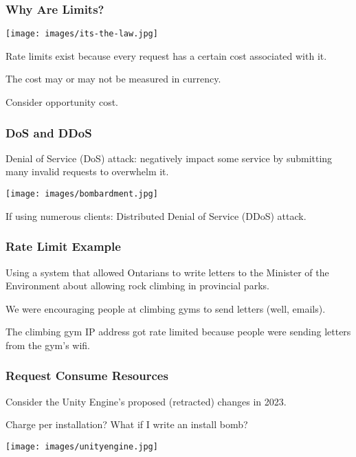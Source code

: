 \begin{frame}
\frametitle{Why Are Limits?}

\begin{center}
  \texttt{[image: images/its-the-law.jpg]}
\end{center}

Rate limits exist because every request has a certain cost associated with it.

The cost may or may not be measured in currency.

Consider opportunity cost.

\end{frame}

\begin{frame}
\frametitle{DoS and DDoS}
\alert{Denial of Service (DoS)} attack: negatively impact some service by submitting many invalid requests to overwhelm it.

\begin{center}
  \texttt{[image: images/bombardment.jpg]}
\end{center}

If using numerous clients: \alert{Distributed Denial of Service (DDoS)} attack. 

\end{frame}

\begin{frame}
\frametitle{Rate Limit Example}

Using a system that allowed Ontarians to write letters to the Minister of the Environment about allowing rock climbing in provincial parks. 

We were encouraging people at climbing gyms to send letters (well, emails).

The climbing gym IP address got rate limited because people were sending letters from the gym's wifi.

\end{frame}

\begin{frame}
\frametitle{Request Consume Resources}

Consider the Unity Engine's proposed (retracted) changes in 2023.

Charge per installation? What if I write an install bomb?

\begin{center}
  \texttt{[image: images/unityengine.jpg]}
\end{center}

\end{frame}

